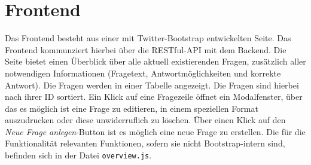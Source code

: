 \section{Frontend}
Das Frontend besteht aus einer mit Twitter-Bootstrap entwickelten Seite. Das Frontend kommunziert hierbei über die RESTful-API mit dem Backend. Die Seite bietet einen Überblick über alle aktuell existierenden Fragen, zusätzlich aller notwendigen Informationen (Fragetext, Antwortmöglichkeiten und korrekte Antwort).
Die Fragen werden in einer Tabelle angezeigt. Die Fragen sind hierbei nach ihrer ID sortiert. Ein Klick auf eine Fragezeile öffnet ein Modalfenster, über das es möglich ist eine Frage zu editieren, in einem speziellen Format auszudrucken oder diese unwiderruflich zu löschen. Über einen Klick auf den \emph{Neue Frage anlegen}-Button ist es möglich eine neue Frage zu erstellen.
Die für die Funktionalität relevanten Funktionen, sofern sie nicht Bootstrap-intern sind, befinden sich in der Datei \texttt{overview.js}.
